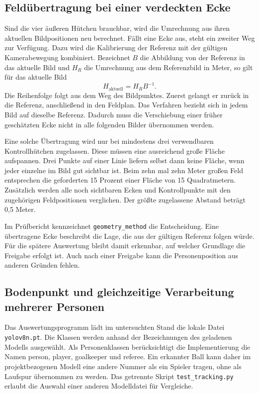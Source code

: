 \subsection{Feldübertragung bei einer verdeckten Ecke}
Sind die vier äußeren Hütchen brauchbar, wird die Umrechnung aus ihren aktuellen Bildpositionen neu berechnet. Fällt eine Ecke aus, steht ein zweiter Weg zur Verfügung. Dazu wird die Kalibrierung der Referenz mit der gültigen Kamerabewegung kombiniert. Bezeichnet $B$ die Abbildung von der Referenz in das aktuelle Bild und $H_R$ die Umrechnung aus dem Referenzbild in Meter, so gilt für das aktuelle Bild
\[
H_{\mathrm{aktuell}}=H_R B^{-1}.
\]
Die Reihenfolge folgt aus dem Weg des Bildpunktes. Zuerst gelangt er zurück in die Referenz, anschließend in den Feldplan. Das Verfahren bezieht sich in jedem Bild auf dieselbe Referenz. Dadurch muss die Verschiebung einer früher geschätzten Ecke nicht in alle folgenden Bilder übernommen werden.

Eine solche Übertragung wird nur bei mindestens drei verwendbaren Kontrollhütchen zugelassen. Diese müssen eine ausreichend große Fläche aufspannen. Drei Punkte auf einer Linie liefern selbst dann keine Fläche, wenn jeder einzelne im Bild gut sichtbar ist. Beim zehn mal zehn Meter großen Feld entsprechen die geforderten 15 Prozent einer Fläche von 15 Quadratmetern. Zusätzlich werden alle noch sichtbaren Ecken und Kontrollpunkte mit den zugehörigen Feldpositionen verglichen. Der größte zugelassene Abstand beträgt 0,5 Meter.

Im Prüfbericht kennzeichnet \lstinline|geometry_method| die Entscheidung. Eine übertragene Ecke beschreibt die Lage, die aus der gültigen Referenz folgen würde. Für die spätere Auswertung bleibt damit erkennbar, auf welcher Grundlage die Freigabe erfolgt ist. Auch nach einer Freigabe kann die Personenposition aus anderen Gründen fehlen.

\subsection{Bodenpunkt und gleichzeitige Verarbeitung mehrerer Personen}
Das Auswertungsprogramm lädt im untersuchten Stand die lokale Datei \lstinline|yolov8n.pt|. Die Klassen werden anhand der Bezeichnungen des geladenen Modells ausgewählt. Als Personenklassen berücksichtigt die Implementierung die Namen person, player, goalkeeper und referee. Ein erkannter Ball kann daher im projektbezogenen Modell eine andere Nummer als ein Spieler tragen, ohne als Laufspur übernommen zu werden. Das getrennte Skript \lstinline|test_tracking.py| erlaubt die Auswahl einer anderen Modelldatei für Vergleiche.

